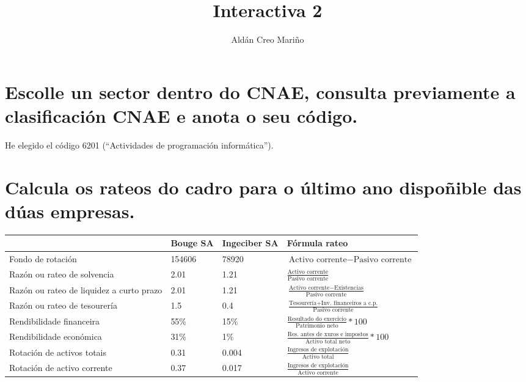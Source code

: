\documentclass[a4paper]{article}
\title{Interactiva 2}
\author{Aldán Creo Mariño}
\begin{document}
\maketitle

\section{Escolle un sector dentro do CNAE, consulta previamente a clasificación CNAE e anota o seu código.}

He elegido el código 6201 (``Actividades de programación informática'').

\section{Calcula os rateos do cadro para o último ano dispoñible das dúas empresas.}

\begin{center}
    \begin{tabular}{ | p{5cm} | p{2cm} | p{2cm} | p{5cm} | }
        \hline
      & Bouge SA & Ingeciber SA & Fórmula rateo \\ \hline
      Fondo de rotación & 154606 & 78920 & $\text{Activo corrente} - \text{Pasivo corrente}$ \\ \hline
      Razón ou rateo de solvencia & 2.01 & 1.21 & $\frac{\text{Activo corrente}}{\text{Pasivo corrente}}$ \\ \hline
      Razón ou rateo de liquidez a curto prazo & 2.01 & 1.21 & $\frac{\text{Activo corrente} - \text{Existencias}}{\text{Pasivo corrente}}$ \\ \hline
      Razón ou rateo de tesourería & 1.5 & 0.4 & $\frac{\text{Tesourería} + \text{Inv. financeiros a c.p.}}{\text{Pasivo corrente}}$ \\ \hline
      Rendibilidade financeira & 55\% & 15\% & $\frac{\text{Resultado do exercicio}}{\text{Patrimonio neto}}*100$ \\ \hline
      Rendibilidade económica & 31\% & 1\% & $\frac{\text{Res. antes de xuros e impostos}}{\text{Activo total neto}}*100$ \\ \hline
      Rotación de activos totais & 0.31 & 0.004 & $\frac{\text{Ingresos de explotación}}{\text{Activo total}}$ \\ \hline
      Rotación de activo corrente & 0.37 & 0.017 & $\frac{\text{Ingresos de explotación}}{\text{Activo corrente}}$ \\ \hline
    \end{tabular}
\end{center}
\end{document}
